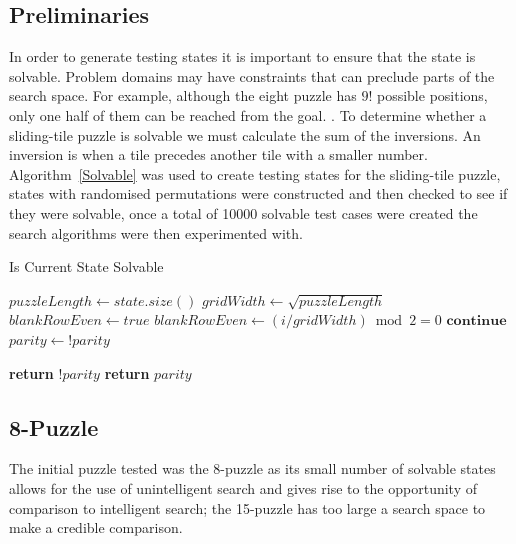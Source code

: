 \documentclass[final]{cmpreport}
\begin{document}
\subsection{Preliminaries}
 In order to generate testing states it is important to ensure that the state is solvable. Problem domains may have constraints that can preclude parts of the search space. For example, although the eight puzzle has $9!$ possible positions, only one half of them can be reached from the goal. \citep{DBLP:journals/ci/CulbersonS98}. To determine whether a sliding-tile puzzle is solvable we must calculate the sum of the inversions.
An inversion is when a tile precedes another tile with a smaller number. 
Algorithm~\ref{Solvable} was used to create testing states for the sliding-tile puzzle, states with randomised permutations were constructed and then checked to see if they were solvable, once a total of 10000 solvable test cases were created the search algorithms were then experimented with.
\begin{algorithm}
	\caption{Is Current State Solvable}\label{Solvable}
	\begin{algorithmic}[H]
		\State $puzzleLength \gets state.size()$
		\State 	$gridWidth \gets \sqrt{puzzleLength}$
		\State $blankRowEven \gets true$
		\State $blankRowEven \gets (i / gridWidth) \bmod 2 = 0$
		\State $\textbf{continue} $
		\State $parity \gets !parity$
		\EndIf
		\EndFor
		\EndIf 
		\EndFor
		
		\State \textbf{return} $!parity$
		\EndIf
		\State \textbf{return} $parity$
		
		\EndProcedure
	\end{algorithmic}	
\end{algorithm}	


\subsection{8-Puzzle}
The initial puzzle tested was the 8-puzzle as its small number of solvable states allows for the use of unintelligent search and gives rise to the opportunity of comparison to intelligent search; the 15-puzzle has too large a search space to make a credible comparison. 
\end{document}

